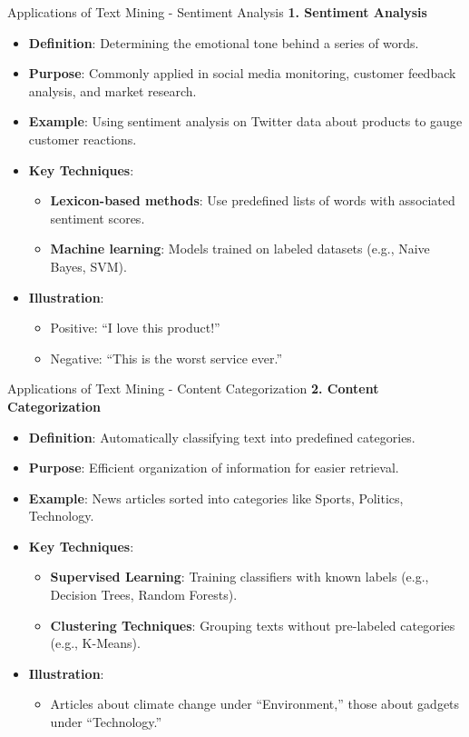 \documentclass[aspectratio=169]{beamer}
\begin{document}
\begin{frame}[fragile]{Applications of Text Mining - Sentiment Analysis}
    \textbf{1. Sentiment Analysis}
    \begin{itemize}
        \item \textbf{Definition}: Determining the emotional tone behind a series of words.
        \item \textbf{Purpose}: Commonly applied in social media monitoring, customer feedback analysis, and market research.
        \item \textbf{Example}: Using sentiment analysis on Twitter data about products to gauge customer reactions.
        \item \textbf{Key Techniques}:
        \begin{itemize}
            \item \textbf{Lexicon-based methods}: Use predefined lists of words with associated sentiment scores.
            \item \textbf{Machine learning}: Models trained on labeled datasets (e.g., Naive Bayes, SVM).
        \end{itemize}
        \item \textbf{Illustration}:
        \begin{itemize}
            \item Positive: “I love this product!”
            \item Negative: “This is the worst service ever.”
        \end{itemize}
    \end{itemize}
\end{frame}

\begin{frame}[fragile]{Applications of Text Mining - Content Categorization}
    \textbf{2. Content Categorization}
    \begin{itemize}
        \item \textbf{Definition}: Automatically classifying text into predefined categories.
        \item \textbf{Purpose}: Efficient organization of information for easier retrieval.
        \item \textbf{Example}: News articles sorted into categories like Sports, Politics, Technology.
        \item \textbf{Key Techniques}:
        \begin{itemize}
            \item \textbf{Supervised Learning}: Training classifiers with known labels (e.g., Decision Trees, Random Forests).
            \item \textbf{Clustering Techniques}: Grouping texts without pre-labeled categories (e.g., K-Means).
        \end{itemize}
        \item \textbf{Illustration}:
        \begin{itemize}
            \item Articles about climate change under “Environment,” those about gadgets under “Technology.”
        \end{itemize}
    \end{itemize}
\end{frame}
\end{document}
